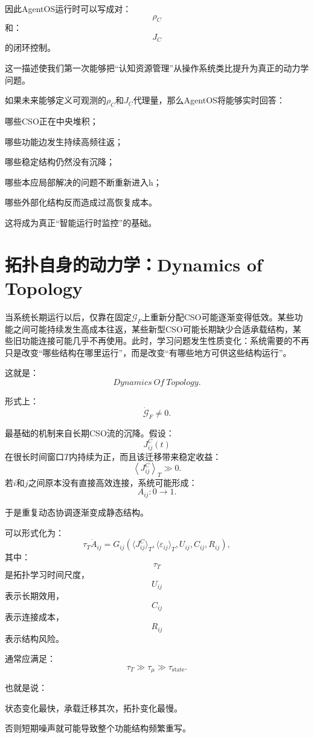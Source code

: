 因此AgentOS运行时可以写成对：
\[
\rho_C
\]
和：
\[
J_C
\]
的闭环控制。

这一描述使我们第一次能够把“认知资源管理”从操作系统类比提升为真正的动力学问题。

如果未来能够定义可观测的$\rho_C$和$J_C$代理量，那么AgentOS将能够实时回答：

哪些CSO正在中央堆积；

哪些功能边发生持续高频往返；

哪些稳定结构仍然没有沉降；

哪些本应局部解决的问题不断重新进入h；

哪些外部化结构反而造成过高恢复成本。

这将成为真正“智能运行时监控”的基础。

\section{拓扑自身的动力学：Dynamics of Topology}

当系统长期运行以后，仅靠在固定$\mathcal G_F$上重新分配CSO可能逐渐变得低效。某些功能之间可能持续发生高成本往返，某些新型CSO可能长期缺少合适承载结构，某些旧功能连接可能几乎不再使用。此时，学习问题发生性质变化：系统需要的不再只是改变“哪些结构在哪里运行”，而是改变“有哪些地方可供这些结构运行”。

这就是：
\[
\boxed{
Dynamics\ Of\ Topology.
}
\]

形式上：
\[
\boxed{
\dot{\mathcal G}_F\neq0.
}
\]

最基础的机制来自长期CSO流的沉降。假设：
\[
J^{C}_{ij}(t)
\]
在很长时间窗口$T$内持续为正，而且该迁移带来稳定收益：
\[
\left\langle
J^{C}_{ij}
\right\rangle_T
\gg0.
\]
若$i$和$j$之间原本没有直接高效连接，系统可能形成：
\[
A_{ij}:0\rightarrow1.
\]

于是重复动态协调逐渐变成静态结构。

可以形式化为：
\[
\tau_T
\dot A_{ij}
=
G_{ij}
\left(
\langle J^C_{ij}\rangle_T,
\langle\varepsilon_{ij}\rangle_T,
U_{ij},
C_{ij},
R_{ij}
\right),
\]
其中：
\[
\tau_T
\]
是拓扑学习时间尺度，
\[
U_{ij}
\]
表示长期效用，
\[
C_{ij}
\]
表示连接成本，
\[
R_{ij}
\]
表示结构风险。

通常应满足：
\[
\tau_T
\gg
\tau_{\mu}
\gg
\tau_{\text{state}}.
\]

也就是说：
\begin{statementbox}
状态变化最快，承载迁移其次，拓扑变化最慢。
\end{statementbox}

否则短期噪声就可能导致整个功能结构频繁重写。

